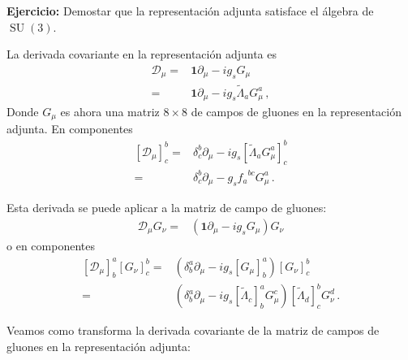 \begin{frame}
\noindent
\textbf{Ejercicio:} Demostar que la representación adjunta satisface el álgebra de $\operatorname{SU}(3)$.


La derivada covariante en la representación adjunta es
\begin{align}
  \mathcal{D}_{\mu}=&\mathbf{1}\partial_{\mu}-i g_s G_{\mu}  \nonumber\\
=&\mathbf{1}\partial_{\mu}-i g_s \widetilde{\Lambda}_a G_{\mu}^{a} \,,
\end{align}
Donde $G_{\mu}$ es ahora una matriz $8\times8$ de campos de gluones en la representación adjunta. En componentes
\begin{align}
 \left[\mathcal{D}_{\mu} \right]^b_c=&\delta^b_c\partial_{\mu}-i g_{s}\left[ \widetilde{\Lambda}_{a} G^a_{\mu} \right]^b_c \nonumber\\
                  =&\delta^b_c\partial_{\mu}- g_{s} {f_{a}}^{bc}  G^a_{\mu} \,.
\end{align}

Esta derivada se puede aplicar a la matriz de campo de gluones:
\begin{align}
  \mathcal{D}_{\mu}  G_{\nu}=& \left(\mathbf{1}\partial_{\mu}-i g_s  G_{\mu} \right)G_{\nu}
\end{align}
o en componentes
\begin{align}
  \left[ \mathcal{D}_{\mu} \right]^{a}_{b} \left[ G_{\nu} \right]^b_c=& \left(\delta^a_b\partial_{\mu}-i g_s \left[ G_{\mu} \right]^{a}_{b} \right)\left[ G_{\nu} \right]^b_c \nonumber\\
    =& \left(\delta^a_b\partial_{\mu}-i g_s \left[  \widetilde{\Lambda}_c \right]^a_b G^c_{\mu} \right) \left[  \widetilde{\Lambda}_d \right]^b_cG_{\nu}^{d}\,.
\end{align}
\end{frame}
Veamos como transforma la derivada covariante de la matriz de campos de gluones en la representación adjunta:

